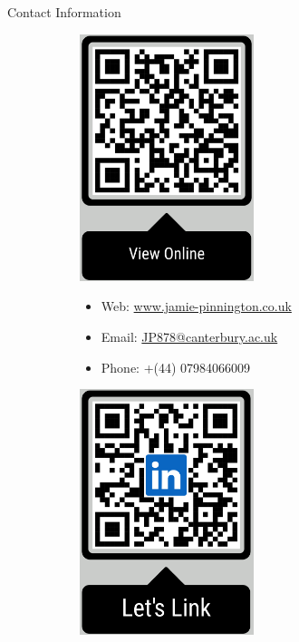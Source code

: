 \documentclass{beamer} %
\begin{document}
\begin{frame}[t]
\begin{columns}[t]
\begin{column}{0.3\textwidth}
			\begin{block}{Contact Information}
				\begin{figure}
					\begin{subfigure}[t]{0.25\linewidth}
						\centering
						\includegraphics[width=2in,valign=t]{qr_online_v6.png}
					\end{subfigure}
					\begin{subfigure}[t]{0.45\linewidth}
						\begin{itemize}
							\item Web: \href{https://www.jamie-pinnington.co.uk}{www.jamie-pinnington.co.uk}
							\item Email: \href{mailto:JP878@canterbury.ac.uk}{JP878@canterbury.ac.uk}
							\item Phone: +(44) 07984066009
						\end{itemize}
					\end{subfigure}
					\begin{subfigure}[t]{0.25\linewidth}
						\centering
						\includegraphics[width=2in,valign=t]{qr_linked_v5.png}
					\end{subfigure}
				\end{figure}
			\end{block}


\end{column}
\end{columns}
\end{frame}
\end{document}

